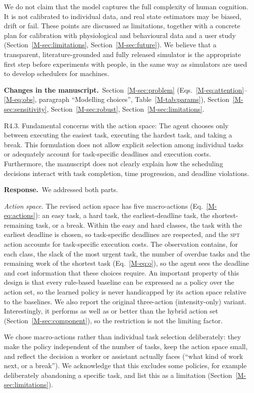 \documentclass[11pt]{article}
\newcommand{\resp}{\par\smallskip\noindent\textbf{Response.}~}
\newcommand{\change}{\par\smallskip\noindent\textbf{Changes in the manuscript.}~}
\newcommand{\Sec}[1]{Section~\ref{M-#1}}
\newcommand{\Eq}[1]{Eq.~\eqref{M-#1}}
\newcommand{\Tab}[1]{Table~\ref{M-#1}}
\begin{document}
We do not claim that the model captures the full complexity of human cognition. It is not calibrated to individual data, and real state estimators may be biased, drift or fail. These points are discussed as limitations, together with a concrete plan for calibration with physiological and behavioural data and a user study (\Sec{sec:limitations}, \Sec{sec:future}). We believe that a transparent, literature-grounded and fully released simulator is the appropriate first step before experiments with people, in the same way as simulators are used to develop schedulers for machines.
\change \Sec{sec:problem} (Eqs.~\eqref{M-eq:attention}--\eqref{M-eq:obs}, paragraph ``Modelling choices'', \Tab{tab:params}), \Sec{sec:sensitivity}, \Sec{sec:robust}, \Sec{sec:limitations}.

\begin{rcomment}{R4.3.}
Fundamental concerns with the action space: The agent chooses only between executing the easiest task, executing the hardest task, and taking a break. This formulation does not allow explicit selection among individual tasks or adequately account for task-specific deadlines and execution costs. Furthermore, the manuscript does not clearly explain how the scheduling decisions interact with task completion, time progression, and deadline violations.
\end{rcomment}
\resp We addressed both parts.

\emph{Action space.} The revised action space has five macro-actions (\Eq{eq:actions}): an easy task, a hard task, the earliest-deadline task, the shortest-remaining task, or a break. Within the easy and hard classes, the task with the earliest deadline is chosen, so task-specific deadlines are respected, and the \textsc{spt} action accounts for task-specific execution costs. The observation contains, for each class, the slack of the most urgent task, the number of overdue tasks and the remaining work of the shortest task (\Eq{eq:o}), so the agent sees the deadline and cost information that these choices require. An important property of this design is that every rule-based baseline can be expressed as a policy over the action set, so the learned policy is never handicapped by its action space relative to the baselines. We also report the original three-action (intensity-only) variant. Interestingly, it performs as well as or better than the hybrid action set (\Sec{sec:component}), so the restriction is not the limiting factor.

We chose macro-actions rather than individual task selection deliberately: they make the policy independent of the number of tasks, keep the action space small, and reflect the decision a worker or assistant actually faces (``what kind of work next, or a break''). We acknowledge that this excludes some policies, for example deliberately abandoning a specific task, and list this as a limitation (\Sec{sec:limitations}).
\end{document}
